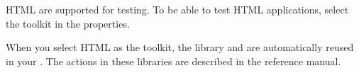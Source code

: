  HTML \gdauts{} are supported for testing. To be able to test HTML applications, select the  toolkit in the \gdproject{} properties. 

When you select HTML as the \gdproject{} toolkit, the library \gdprojects{}  and   are automatically reused in your \gdproject{}. The actions in these libraries are described in the reference manual.
